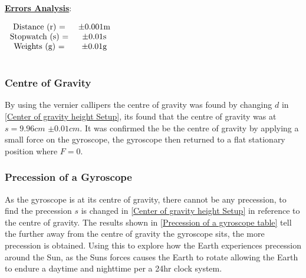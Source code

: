 \documentclass[12pt]{article}
\begin{document}
\textbf{\underline{Errors Analysis}}: \\
\begin{table}[H]
\begin{center}
 \begin{math}
 \begin{tabular}{c c c}
 Distance (r)  = & $\pm$0.001m \\
 Stopwatch (s) = & $\pm$0.01s \\
 Weights (g) = & $\pm$0.01g \\ \\
 \end{tabular}
 \end{math}
 \caption{Moment of Inertia Error Analysis.}
 \label{2.1 Error Analysis}
\end{center}
\end{table}

\subsubsection{Centre of Gravity}
\label{Centre of Gravity Findings}

By using the vernier callipers the centre of gravity was found by changing $d$ in \cref{Center of gravity height Setup}, its found that the centre of gravity was at $s=9.96cm$ $\pm0.01cm$. It was confirmed the be the centre of gravity by applying a small force on the gyroscope, the gyroscope then returned to a flat stationary position where $F=0$. 

\subsubsection{Precession of a Gyroscope}
\label{Precession of a Gyroscope Findings}

As the gyroscope is at its centre of gravity, there cannot be any precession, to find the precession $s$ is changed in \cref{Center of gravity height Setup} in reference to the centre of gravity. The results shown in \cref{Precession of a gyroscope table} tell the further away from the centre of gravity the gyroscope sits, the more precession is obtained. Using this to explore how the Earth experiences precession around the Sun, as the Suns forces causes the Earth to rotate allowing the Earth to endure a daytime and nighttime per a 24hr clock system. \\
\end{document}
